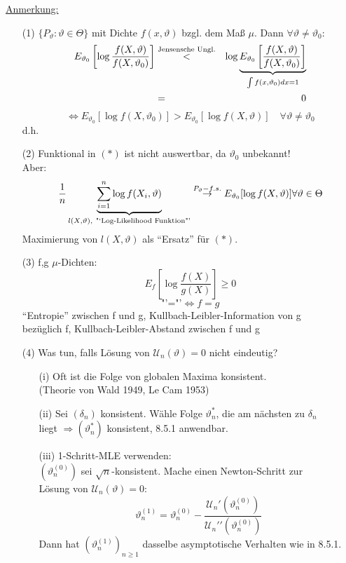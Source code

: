 \documentclass[a4paper,11pt,twoside,titlepage]{article}
\newcommand\UU{ \mathcal{U} } %
\begin{document}
\underline{Anmerkung:}
\begin{itemize}
\item[(1) ]$\{P_\vartheta:\vartheta\in\Theta\}$ mit Dichte $f(x,\vartheta)$ bzgl. dem Maß $\mu$. Dann $\forall\vartheta\neq\vartheta_0$:
\begin{eqnarray*}
E_{\vartheta_0}\left[\log \frac{f(X,\vartheta)}{f(X,\vartheta_0)}\right]&\stackrel{\textnormal{Jensensche Ungl.}}{<}&
\log \underbrace{E_{\vartheta_0}\left[\frac{f(X,\vartheta)}{f(X,\vartheta_0)}\right]}_{\int f(x,\vartheta_0)dx=1}\\
&=&0
\end{eqnarray*}
$$\Leftrightarrow E_{\vartheta_0}[\log f(X,\vartheta_0)]>E_{\vartheta_0}[\log f(X,\vartheta)]\quad \forall\vartheta\neq\vartheta_0$$
d.h. 
\item[(2) ]Funktional in $(\ast)$ ist nicht auswertbar, da $\vartheta_0$ unbekannt!\\
Aber: $$\frac1n\underbrace{\sum_{i=1}^n \log f(X_i,\vartheta)}_{l(X,\vartheta),\ \textnormal{"`Log-Likelihood Funktion"'}}
\stackrel{P_\vartheta -f.s.}{\rightarrow}E_{\vartheta_0}[\log f(X,\vartheta)]\forall\vartheta\in\Theta$$
Maximierung von $l(X,\vartheta)$ als "`Ersatz"' für $(\ast)$.
\item[(3) ]f,g $\mu$-Dichten:
$$E_f\left[\log \frac{f(X)}{g(X)}\right]\geq0$$
$$\mbox{"'="'} \Leftrightarrow f=g$$
"`Entropie"' zwischen f und g, Kullbach-Leibler-Information von g\\ bezüglich f, Kullbach-Leibler-Abstand zwischen f und g

\item[(4)] Was tun, falls Lösung von $\UU_n(\vartheta)=0$ nicht eindeutig?
\begin{itemize}
\item[(i)] Oft ist die Folge von globalen Maxima konsistent.\\ (Theorie von Wald 1949, Le Cam 1953)
\item[(ii)] Sei $(\delta_n)$ konsistent. Wähle Folge $\vartheta_n^\ast$, die am nächsten zu $\delta_n$\\ liegt $\Rightarrow (\vartheta_n^\ast)$ konsistent, 8.5.1 anwendbar.
\item[(iii)] 1-Schritt-MLE verwenden:\\
$(\vartheta_n^{(0)})$ sei $\sqrt n$-konsistent. Mache einen Newton-Schritt zur\\ Lösung von $\UU_n(\vartheta)=0$:
\[\vartheta_n^{(1)}=\vartheta_n^{(0)}-\frac{\UU_n'(\vartheta_n^{(0)})}{\UU_n'{'}(\vartheta_n^{(0)})}\]
Dann hat $(\vartheta_n^{(1)})_{n\geq1}$ dasselbe asymptotische Verhalten wie in 8.5.1.
\end{itemize}
\end{itemize}
\end{document}
